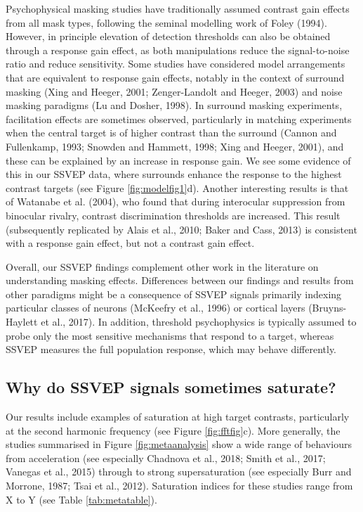 \documentclass[]{article}
\begin{document}
Psychophysical masking studies have traditionally assumed contrast gain effects from all mask types, following the seminal modelling work of Foley (1994). However, in principle elevation of detection thresholds can also be obtained through a response gain effect, as both manipulations reduce the signal-to-noise ratio and reduce sensitivity. Some studies have considered model arrangements that are equivalent to response gain effects, notably in the context of surround masking (Xing and Heeger, 2001; Zenger-Landolt and Heeger, 2003) and noise masking paradigms (Lu and Dosher, 1998). In surround masking experiments, facilitation effects are sometimes observed, particularly in matching experiments when the central target is of higher contrast than the surround (Cannon and Fullenkamp, 1993; Snowden and Hammett, 1998; Xing and Heeger, 2001), and these can be explained by an increase in response gain. We see some evidence of this in our SSVEP data, where surrounds enhance the response to the highest contrast targets (see Figure \ref{fig:modelfig1}d). Another interesting results is that of Watanabe et al. (2004), who found that during interocular suppression from binocular rivalry, contrast discrimination thresholds are increased. This result (subsequently replicated by Alais et al., 2010; Baker and Cass, 2013) is consistent with a response gain effect, but not a contrast gain effect.

Overall, our SSVEP findings complement other work in the literature on understanding masking effects. Differences between our findings and results from other paradigms might be a consequence of SSVEP signals primarily indexing particular classes of neurons (McKeefry et al., 1996) or cortical layers (Bruyns-Haylett et al., 2017). In addition, threshold psychophysics is typically assumed to probe only the most sensitive mechanisms that respond to a target, whereas SSVEP measures the full population response, which may behave differently.

\hypertarget{why-do-ssvep-signals-sometimes-saturate}{%
\subsection{Why do SSVEP signals sometimes saturate?}\label{why-do-ssvep-signals-sometimes-saturate}}

Our results include examples of saturation at high target contrasts, particularly at the second harmonic frequency (see Figure \ref{fig:fftfig}c). More generally, the studies summarised in Figure \ref{fig:metaanalysis} show a wide range of behaviours from acceleration (see especially Chadnova et al., 2018; Smith et al., 2017; Vanegas et al., 2015) through to strong supersaturation (see especially Burr and Morrone, 1987; Tsai et al., 2012). Saturation indices for these studies range from X to Y (see Table \ref{tab:metatable}).
\end{document}
